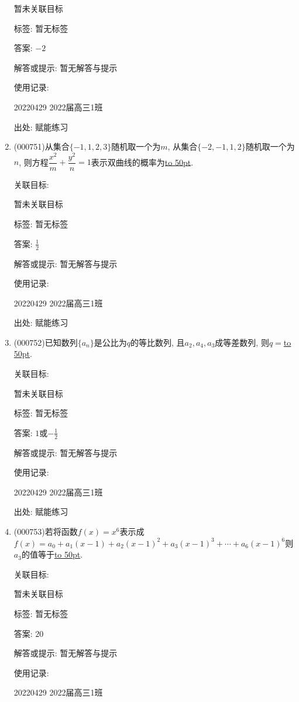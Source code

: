 \documentclass[10pt,a4paper]{article}
\newcommand{\blank}[1]{\underline{\hbox to #1pt{}}}
\begin{document}
\begin{enumerate}[1.]
暂未关联目标



标签: 暂无标签

答案: $-2$

解答或提示: 暂无解答与提示

使用记录:

20220429	2022届高三1班	


出处: 赋能练习
\item { (000751)}从集合$\{-1,1,2,3\}$随机取一个为$m$, 从集合$\{-2,-1,1,2\}$随机取一个为$n$, 则方程$\dfrac{x^2}m+\dfrac{y^2}n=1$表示双曲线的概率为\blank{50}.


关联目标:

暂未关联目标



标签: 暂无标签

答案: $\frac 12$

解答或提示: 暂无解答与提示

使用记录:

20220429	2022届高三1班	


出处: 赋能练习
\item { (000752)}已知数列$\{a_n\}$是公比为$q$的等比数列, 且$a_2,a_4,a_3$成等差数列, 则$q=$\blank{50}.


关联目标:

暂未关联目标



标签: 暂无标签

答案: $1$或$-\frac 12$

解答或提示: 暂无解答与提示

使用记录:

20220429	2022届高三1班	


出处: 赋能练习
\item { (000753)}若将函数$f(x)=x^6$表示成$f(x)=a_0+a_1(x-1)+a_2(x-1)^2+a_3(x-1)^3+\cdots+a_6(x-1)^6$则$a_3$的值等于\blank{50}.


关联目标:

暂未关联目标



标签: 暂无标签

答案: $20$

解答或提示: 暂无解答与提示

使用记录:

20220429	2022届高三1班	



\end{enumerate}
\end{document}
